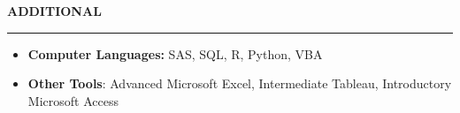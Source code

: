 \documentclass[11pt,letterpaper]{article}
\newcommand{\sectline}{\vspace{5pt}\hrule height 1.5pt\vspace{5pt}}
\begin{document}
\textbf{ADDITIONAL}\sectline
\begin{itemize}
	\item \textbf{Computer Languages:} SAS, SQL, R, Python, VBA
	\item \textbf{Other Tools}: Advanced Microsoft Excel, Intermediate Tableau, Introductory Microsoft Access
\end{itemize}
\end{document}
